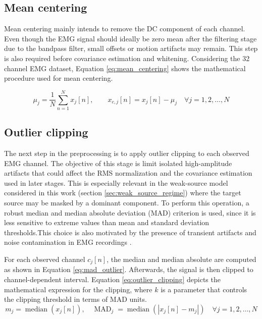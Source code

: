 \subsection{Mean centering}
\label{subsec:mean_centering}
Mean centering mainly intends to remove the DC component of each channel. Even though the EMG signal should ideally be zero mean after the filtering stage due to the bandpass filter, small offsets or motion artifacts may remain. This step is also required before covariance estimation and whitening. Considering the 32 channel EMG dataset, Equation \ref{eq:mean_centering} shows the mathematical procedure used for mean centering.

\begin{equation}
\mu_j = \frac{1}{N}\sum_{n=1}^{N} x_j[n],
\qquad
x_{c,j}[n] = x_j[n] - \mu_j  \quad \forall j=1,2,\dots,N 
\label{eq:mean_centering}
\end{equation}
\subsection{Outlier clipping}
The next step in the preprocessing is to apply outlier clipping to each observed EMG channel. The objective of this stage is limit isolated high-amplitude artifacts that could affect the RMS normalization and the covariance estimation used in later stages. This is especially relevant in the weak-source model considered in this work (section \ref{sec:weak_source_regime}) where the target source may be masked by a dominant component. To perform this operation, a robust median and median absolute deviation (MAD) criterion is used, since it is less sensitive to extreme values than mean and standard deviation thresholds\cite{hoaglin_volume_2013}.This choice is also motivated by the presence of transient artifacts and noise contamination in EMG recordings \cite{boyer_reducing_2023}.

For each observed channel \(c_j[n]\), the median and median absolute are computed as shown in Equation \ref{eq:mad_outlier}. Afterwards, the signal is then clipped to channel-dependent interval. Equation \ref{eq:outlier_clipping} depicts the mathematical expression for the clipping, where $k$ is a parameter that controls the clipping threshold in terms of MAD units.
\begin{equation}
m_j = \operatorname{median}\left(x_j[n]\right),
\quad
\operatorname{MAD}_j =
\operatorname{median}\left(\left|x_j[n]-m_j\right|\right)
\quad \forall j=1,2,\dots,N 
\label{eq:mad_outlier}
\end{equation}

